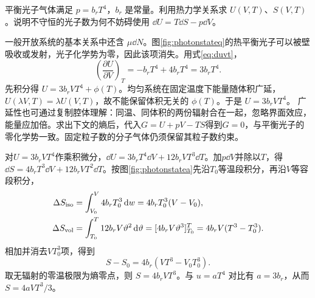\begin{example}[从辐射压强求能量与熵]\label{ex:photonstate}
平衡光子气体满足 $p=b_rT^4$，$b_r$ 是常量。利用热力学关系求 $U(V,T)$、$S(V,T)$。说明不守恒的光子数为何不妨碍使用 $\dd U=T\dd S-p\dd V$。
\end{example}
\begin{solution}
一般开放系统的基本关系中还含 $\mu\dd N$。图\ref{fig:photonstateq}的热平衡光子可以被壁吸收或发射，光子化学势为零，因此该项消失。用式\eqref{eq:duvt}，
\[
 \left(\frac{\partial U}{\partial V}\right)_T=-b_rT^4+4b_rT^4=3b_rT^4.
\]
先积分得 $U=3b_rVT^4+\phi(T)$。均匀系统在固定温度下能量随体积广延，$U(\lambda V,T)=\lambda U(V,T)$，故不能保留体积无关的 $\phi(T)$。于是 $U=3b_rVT^4$。
广延性也可通过复制腔体理解：同温、同体积的两份辐射合在一起，忽略界面效应，能量应加倍。求出下文的熵后，代入$G=U+pV-TS$得到$G=0$，与平衡光子的零化学势一致。固定粒子数的分子气体仍须保留其粒子数约束。

对$U=3b_rVT^4$作乘积微分，$\dd U=3b_rT^4\dd V+12b_rVT^3\dd T$。加$p\dd V$并除以$T$，得$\dd S=4b_rT^3\dd V+12b_rVT^2\dd T$。按图\ref{fig:photonstatea}先沿$T_0$等温段积分，再沿$V$等容段积分，
\begin{align*}
 \Delta S_{\rm iso}&=\int_{V_0}^{V}4b_rT_0^3\mathop{}\!\mathrm d w=4b_rT_0^3(V-V_0),\\
 \Delta S_{\rm vol}&=\int_{T_0}^{T}12b_rV\vartheta^2\mathop{}\!\mathrm d\vartheta
 =[4b_rV\vartheta^3]_{T_0}^{T}=4b_rV(T^3-T_0^3).
\end{align*}
相加并消去$VT_0^3$项，得到
\[
 S-S_0=4b_r(VT^3-V_0T_0^3).
\]
取无辐射的零温极限为熵零点，则 $S=4b_rVT^3$。与 $u=aT^4$ 对比有 $a=3b_r$，从而 $S=4aVT^3/3$。
\end{solution}

